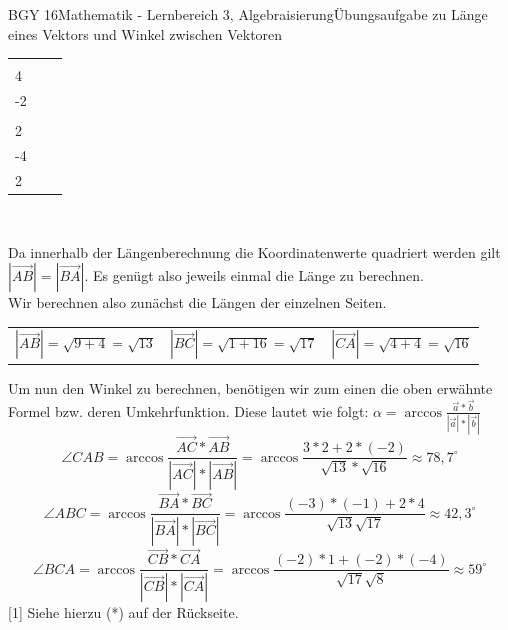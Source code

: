 \documentclass[oneside,openany,headings=optiontotoc,11pt,numbers=noenddot]{scrreprt}
\begin{document}
\begin{worksheet}{BGY 16}{Mathematik - Lernbereich 3, Algebraisierung}{Übungsaufgabe zu Länge eines Vektors und Winkel zwischen Vektoren}
\begin{framed}
\begin{tabularx}{\textwidth}{XXX}
				\(\vec{BC} =\left(\begin{array}{c}-1\\4\end{array}\right)\) &
				\(\vec{CA}=\left(\begin{array}{c}-2\\-2\end{array}\right)\)\\
				\(\vec{BA}= \left(\begin{array}{c}-3\\2\end{array}\right)\) &
				\(\vec{CB}=\left(\begin{array}{c}1\\-4\end{array}\right)\) &
				\(\vec{AC}=\left(\begin{array}{c}2\\2\end{array}\right)\)
			\end{tabularx}
			\\
			\par\noindent
			\tiny{\color{codegray}Da innerhalb der Längenberechnung die Koordinatenwerte quadriert werden gilt \(|\vec{AB}| = |\vec{BA}|\). Es genügt also jeweils einmal die Länge zu berechnen.}\\\noindent
			\normalsize
			Wir berechnen also zunächst die Längen der einzelnen Seiten.\\
			\par\noindent
			\begin{tabularx}{\textwidth}{XXX}
				\(|\vec{AB}| = \sqrt{9+4} = \sqrt{13}\) & \(|\vec{BC}| = \sqrt{1+16} = \sqrt{17}\) & \(|\vec{CA}| = \sqrt{4+4} = \sqrt{16}\)
			\end{tabularx}
			\par\bigskip\noindent
			Um nun den Winkel zu berechnen, benötigen wir zum einen die oben erwähnte Formel bzw. deren Umkehrfunktion. Diese lautet wie folgt: \(\alpha = \arccos{\frac{\vec{a}*\vec{b}}{|\vec{a}|*|\vec{b}|}}\)
			\[\angle{CAB} = \arccos{\frac{\vec{AC}*\vec{AB}}{|\vec{AC}|*|\vec{AB}|}} =\arccos{\frac{3*2 + 2*(-2)}{\sqrt{13}*\sqrt{16}}} \approx 78,7^{\circ}\]
			\[\angle{ABC} = \arccos{\frac{\vec{BA}*\vec{BC}}{|\vec{BA}|*|\vec{BC}|}} =\arccos{\frac{(-3)*(-1) + 2*4}{\sqrt{13}\sqrt{17}}} \approx 42,3^{\circ}\]
			\[\angle{BCA} = \arccos{\frac{\vec{CB}*\vec{CA}}{|\vec{CB}|*|\vec{CA}|}} =\arccos{\frac{(-2)*1 +(-2)*(-4)}{\sqrt{17}\sqrt{8}}} \approx 59^{\circ}\]
			\small{\color{codegray}[1] Siehe hierzu (*) auf der Rückseite.}

\end{framed}
\end{worksheet}
\end{document}
